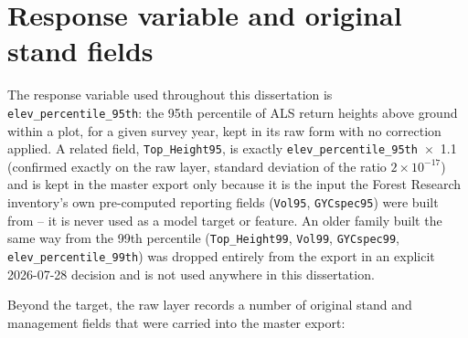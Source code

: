 \section{Response variable and original stand fields}
\label{sec:data-response}

The response variable used throughout this dissertation is \texttt{elev\_percentile\_95th}: the
95th percentile of ALS return heights above ground within a plot, for a given survey year, kept
in its raw form with no correction applied. A related field, \texttt{Top\_Height95}, is exactly
\texttt{elev\_percentile\_95th}~$\times$~1.1 (confirmed exactly on the raw layer, standard
deviation of the ratio $2\times10^{-17}$) and is kept in the master export only because it is the
input the Forest Research inventory's own pre-computed reporting fields (\texttt{Vol95},
\texttt{GYCspec95}) were built from -- it is never used as a model target or feature. An older
family built the same way from the 99th percentile (\texttt{Top\_Height99}, \texttt{Vol99},
\texttt{GYCspec99}, \texttt{elev\_percentile\_99th}) was dropped entirely from the export in an
explicit 2026-07-28 decision and is not used anywhere in this dissertation.

Beyond the target, the raw layer records a number of original stand and management fields that
were carried into the master export:

